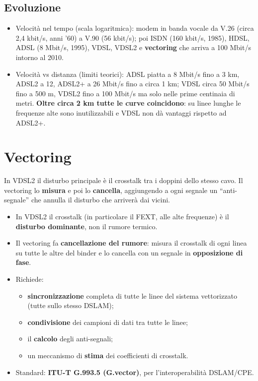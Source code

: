 \subsection{Evoluzione}

\begin{itemize}
\tightlist
\item
  Velocità nel tempo (scala logaritmica): modem in banda vocale da V.26 (circa 2,4 kbit/s, anni '60) a V.90 (56 kbit/s); poi ISDN (160 kbit/s, 1985), HDSL, ADSL (8 Mbit/s, 1995), VDSL, VDSL2 e \textbf{vectoring} che arriva a 100 Mbit/s intorno al 2010.
\item
  Velocità vs distanza (limiti teorici): ADSL piatta a 8 Mbit/s fino a 3 km, ADSL2 a 12, ADSL2+ a 26 Mbit/s fino a circa 1 km; VDSL circa 50 Mbit/s fino a 500 m, VDSL2 fino a 100 Mbit/s ma solo nelle prime centinaia di metri. \textbf{Oltre circa 2 km tutte le curve coincidono}: su linee lunghe le frequenze alte sono inutilizzabili e VDSL non dà vantaggi rispetto ad ADSL2+.
\end{itemize}

\section{Vectoring}

\begin{inbreve}

In VDSL2 il disturbo principale è il crosstalk tra i doppini dello stesso cavo. Il vectoring lo \textbf{misura} e poi lo \textbf{cancella}, aggiungendo a ogni segnale un ``anti-segnale'' che annulla il disturbo che arriverà dai vicini.

\end{inbreve}

\begin{itemize}
\tightlist
\item
  In VDSL2 il crosstalk (in particolare il FEXT, alle alte frequenze) è il \textbf{disturbo dominante}, non il rumore termico.
\item
  Il vectoring fa \textbf{cancellazione del rumore}: misura il crosstalk di ogni linea su tutte le altre del binder e lo cancella con un segnale in \textbf{opposizione di fase}.
\item
  Richiede:

  \begin{itemize}
  \tightlist
  \item
    \textbf{sincronizzazione} completa di tutte le linee del sistema vettorizzato (tutte sullo stesso DSLAM);
  \item
    \textbf{condivisione} dei campioni di dati tra tutte le linee;
  \item
    il \textbf{calcolo} degli anti-segnali;
  \item
    un meccanismo di \textbf{stima} dei coefficienti di crosstalk.
  \end{itemize}
\item
  Standard: \textbf{ITU-T G.993.5 (G.vector)}, per l'interoperabilità DSLAM/CPE.
\end{itemize}

